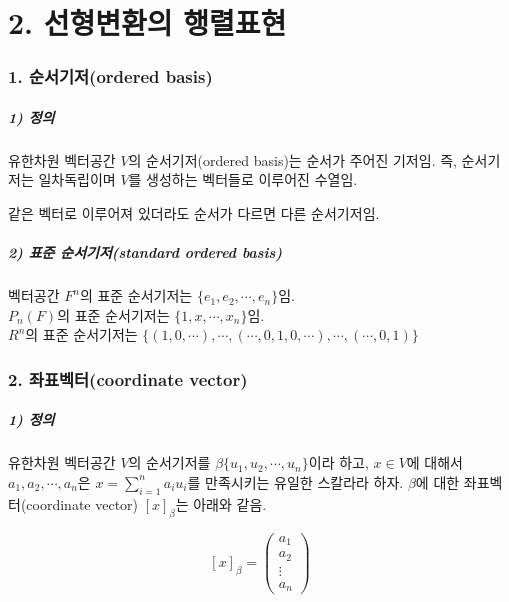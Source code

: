 \documentclass[10pt, a4paper]{article}
\begin{document}
\newpage


\part*{2. 선형변환의 행렬표현}

\section*{1. 순서기저(ordered basis)}

\subsubsection*{1) 정의}
유한차원 벡터공간 $V$의 순서기저(ordered basis)는 순서가 주어진 기저임. 즉, 순서기저는 일차독립이며 $V$를 생성하는 벡터들로 이루어진 수열임.

같은 벡터로 이루어져 있더라도 순서가 다르면 다른 순서기저임.

\subsubsection*{2) 표준 순서기저(standard ordered basis)}
벡터공간 $F^n$의 표준 순서기저는 $\{e_1,e_2, \cdots ,e_n\}$임.\\
$P_n(F)$의 표준 순서기저는 $\{1,x, \cdots ,x_n\}$임.\\
$R^n$의 표준 순서기저는 $\{{(1,0, \cdots), \cdots ,(\cdots ,0,1,0, \cdots), \cdots ,(\cdots ,0,1)}\}$


\section*{2. 좌표벡터(coordinate vector)}

\subsubsection*{1) 정의}
유한차원 벡터공간 $V$의 순서기저를 $\beta \{u_1,u_2, \cdots ,u_n\}$이라 하고, $x \in V$에 대해서 $a_1,a_2, \cdots ,a_n$은 $x = \sum_{i=1}^{n}{a_{i}u_{i}}$를 만족시키는 유일한 스칼라라 하자. $\beta$에 대한 좌표벡터(coordinate vector) $[x]_{\beta}$는 아래와 같음.

\[
[x]_{\beta} = 
\begin{pmatrix}
a_{1} \\
a_{2} \\
\vdots \\
a_{n}
\end{pmatrix}
\]
\end{document}
